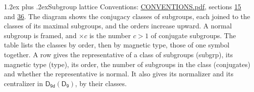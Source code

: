 \documentclass[10pt,a4paper]{article}
\makeatletter
\renewcommand\section{\@startsection{section}{1}{\z@}{-3ex plus -1ex minus -.2ex}%
  {1.2ex plus .2ex}{\normalfont\large\sffamily\bfseries\color{parttitle}}}
\numberwithin{equation}{section}
\newcommand{\grp}[1]{\mathsf{#1}}
\makeatother
\begin{document}
\section{Subgroup lattice}\label{s:subgroups}
Conventions: \href{../../CONVENTIONS.pdf}{CONVENTIONS.pdf}, sections \href{../../../rotation/CONVENTIONS.pdf\#conv.15}{15} and \href{../../CONVENTIONS.pdf\#conv.36}{36}.
The diagram shows the conjugacy classes of subgroups, each joined to the classes of its maximal subgroups, and the orders increase upward. \label{n:index.conjugates.c}\label{n:mark.conjugates}A normal subgroup is framed, and ${\times}c$ is the number $c > 1$ of conjugate subgroups. The table lists the classes by order, then by magnetic type, those of one symbol together. \label{n:head.subgroup}\label{n:head.magnetic.type}\label{n:head.order}\label{n:head.conjugates}\label{n:head.normal}A row gives the representative of a class of subgroups (subgrp), its magnetic type (type), its order, the number of subgroups in the class (conjugates) and whether the representative is normal. \label{n:head.normalizer}\label{n:head.centralizer}It also gives its normalizer and its centralizer in $\grp{D_{9d}}(\grp{D_{9}})$, by their classes. 
\end{document}
